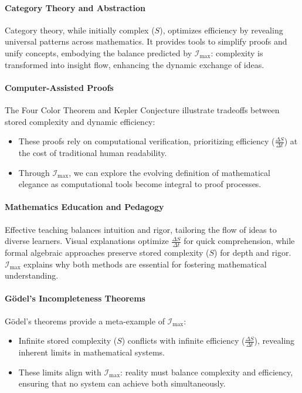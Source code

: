 \documentclass[12pt]{article}
\begin{document}
\paragraph{Category Theory and Abstraction}
Category theory, while initially complex (\(S\)), optimizes efficiency by revealing universal patterns across mathematics. It provides tools to simplify proofs and unify concepts, embodying the balance predicted by \(\mathcal{I}_{\text{max}}\): complexity is transformed into insight flow, enhancing the dynamic exchange of ideas.

\paragraph{Computer-Assisted Proofs}
The Four Color Theorem and Kepler Conjecture illustrate tradeoffs between stored complexity and dynamic efficiency:
\begin{itemize}
    \item These proofs rely on computational verification, prioritizing efficiency (\(\frac{\Delta S}{\Delta t}\)) at the cost of traditional human readability.
    \item Through \(\mathcal{I}_{\text{max}}\), we can explore the evolving definition of mathematical elegance as computational tools become integral to proof processes.
\end{itemize}

\paragraph{Mathematics Education and Pedagogy}
Effective teaching balances intuition and rigor, tailoring the flow of ideas to diverse learners. Visual explanations optimize \(\frac{\Delta S}{\Delta t}\) for quick comprehension, while formal algebraic approaches preserve stored complexity (\(S\)) for depth and rigor. \(\mathcal{I}_{\text{max}}\) explains why both methods are essential for fostering mathematical understanding.

\paragraph{Gödel’s Incompleteness Theorems}
Gödel’s theorems provide a meta-example of \(\mathcal{I}_{\text{max}}\):
\begin{itemize}
    \item Infinite stored complexity (\(S\)) conflicts with infinite efficiency (\(\frac{\Delta S}{\Delta t}\)), revealing inherent limits in mathematical systems.
    \item These limits align with \(\mathcal{I}_{\text{max}}\): reality must balance complexity and efficiency, ensuring that no system can achieve both simultaneously.
\end{itemize}
\end{document}
